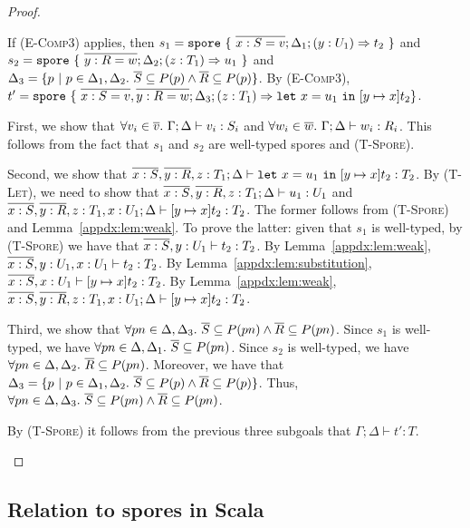 \begin{proof}
\begin{itemize}
If (\textsc{E-Comp3}) applies, then $s_1 = \texttt{spore}~\{~\overline{x:S=v}; \Delta_1; (y: U_1) \Rightarrow t_2~\}$ and $s_2 = \texttt{spore}~\{~\overline{y:R=w}; \Delta_2; (z: T_1) \Rightarrow u_1~\}$ and $\Delta_3 = \{ p~|~p \in \Delta_1,\Delta_2.~\overline{S} \subseteq P(p) \land \overline{R} \subseteq P(p)\}$. By (\textsc{E-Comp3}), \\ $t' = \texttt{spore}~\{~\overline{x:S=v}, \overline{y:R=w} ; \Delta_3 ; (z: T_1) \Rightarrow \texttt{let}~x = u_1~\texttt{in}~[y \mapsto x]t_2\}$.

First, we show that $\forall v_i \in \overline{v}.~\Gamma ; \Delta \vdash v_i : S_i$ and $\forall w_i \in \overline{w}.~\Gamma ; \Delta \vdash w_i : R_i$. This follows from the fact that $s_1$ and $s_2$ are well-typed spores and (\textsc{T-Spore}).

Second, we show that $\overline{x:S}, \overline{y:R}, z:T_1 ; \Delta \vdash \texttt{let}~x = u_1~\texttt{in}~[y \mapsto x]t_2 : T_2$. By (\textsc{T-Let}), we need to show that $\overline{x:S}, \overline{y:R}, z:T_1 ; \Delta \vdash u_1 : U_1$ and $\overline{x:S}, \overline{y:R}, z:T_1, x:U_1 ; \Delta \vdash [y \mapsto x]t_2 : T_2$. The former follows from (\textsc{T-Spore}) and Lemma~\ref{appdx:lem:weak}. To prove the latter: given that $s_1$ is well-typed, by (\textsc{T-Spore}) we have that $\overline{x:S}, y:U_1 \vdash t_2 : T_2$. By Lemma~\ref{appdx:lem:weak}, $\overline{x:S}, y:U_1, x:U_1 \vdash t_2 : T_2$. By Lemma~\ref{appdx:lem:substitution}, $\overline{x:S}, x:U_1 \vdash [y \mapsto x]t_2 : T_2$. By Lemma~\ref{appdx:lem:weak}, $\overline{x:S}, \overline{y:R}, z:T_1, x:U_1 ; \Delta \vdash [y \mapsto x]t_2 : T_2$.

Third, we show that $\forall pn \in \Delta, \Delta_3.~\overline{S} \subseteq P(pn) \land \overline{R} \subseteq P(pn)$. Since $s_1$ is well-typed, we have $\forall pn \in \Delta, \Delta_1.~\overline{S} \subseteq P(pn)$. Since $s_2$ is well-typed, we have $\forall pn \in \Delta, \Delta_2.~\overline{R} \subseteq P(pn)$. Moreover, we have that $\Delta_3 = \{ p~|~p \in \Delta_1,\Delta_2.~\overline{S} \subseteq P(p) \land \overline{R} \subseteq P(p)\}$. Thus, $\forall pn \in \Delta, \Delta_3.~\overline{S} \subseteq P(pn) \land \overline{R} \subseteq P(pn)$.

By (\textsc{T-Spore}) it follows from the previous three subgoals that $\Gamma ; \Delta \vdash t' : T$.

\end{itemize}
\end{proof}


\subsection{Relation to spores in Scala}

